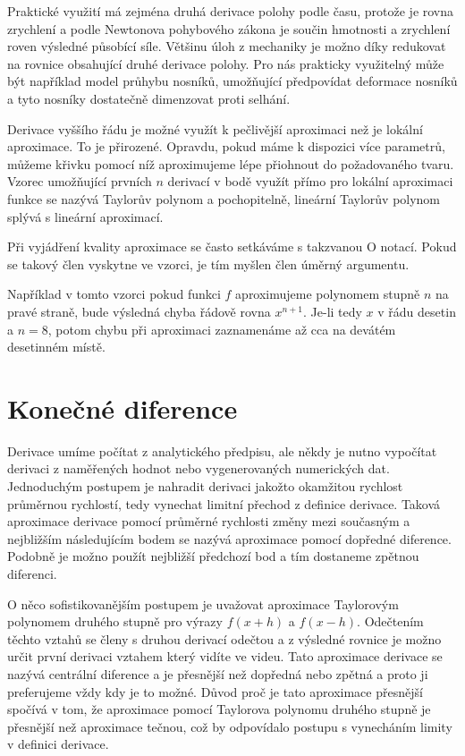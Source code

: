 \documentclass[12pt]{article}
\begin{document}
Praktické využití má zejména druhá derivace polohy podle času, protože je rovna zrychlení a podle Newtonova pohybového zákona je součin hmotnosti a zrychlení roven výsledné působící síle. Většinu úloh z mechaniky je možno díky redukovat na rovnice obsahující druhé derivace polohy. Pro nás prakticky využitelný může být například model průhybu nosníků, umožňující předpovídat deformace nosníků a tyto nosníky dostatečně dimenzovat proti selhání.  

Derivace vyššího řádu je možné využít k pečlivější aproximaci než je lokální aproximace. To je přirozené. Opravdu, pokud máme k dispozici více parametrů, můžeme křivku pomocí níž aproximujeme lépe přiohnout do požadovaného tvaru. Vzorec umožňující prvních $n$ derivací v bodě využít přímo pro lokální aproximaci funkce se nazývá Taylorův polynom a pochopitelně, lineární Taylorův polynom splývá s lineární aproximací.

Při vyjádření kvality aproximace se často setkáváme s takzvanou O notací. Pokud se takový člen vyskytne ve vzorci, je tím myšlen člen úměrný argumentu.

Například v tomto vzorci pokud funkci $f$ aproximujeme polynomem stupně $n$ na pravé straně, bude výsledná chyba řádově rovna $x^{n+1}$. Je-li tedy $x$ v řádu desetin a $n=8$, potom chybu při aproximaci zaznamenáme až cca na devátém desetinném místě.


\section*{Konečné diference}

Derivace umíme počítat z analytického předpisu, ale někdy je nutno vypočítat derivaci z naměřených hodnot nebo vygenerovaných numerických dat. Jednoduchým postupem je nahradit derivaci jakožto okamžitou rychlost průměrnou rychlostí, tedy vynechat limitní přechod z definice derivace. Taková aproximace derivace pomocí průměrné rychlosti změny mezi současným a nejbližším následujícím bodem se nazývá aproximace pomocí dopředné diference. Podobně je možno použít nejbližší předchozí bod a tím dostaneme zpětnou diferenci.

O něco sofistikovanějším postupem je uvažovat aproximace Taylorovým polynomem druhého stupně pro výrazy $f(x+h)$ a $f(x-h)$. Odečtením těchto vztahů se členy s druhou derivací odečtou a z výsledné rovnice je možno určit první derivaci vztahem který vidíte ve videu. Tato aproximace derivace se nazývá centrální diference a je přesnější než dopředná nebo zpětná a proto ji preferujeme vždy kdy je to možné. Důvod proč je tato aproximace přesnější spočívá v tom, že aproximace pomocí Taylorova polynomu druhého stupně je přesnější než aproximace tečnou, což by odpovídalo postupu s vynecháním limity v definici derivace.
\end{document}
